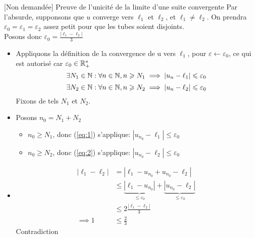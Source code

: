 \documentclass{article}
\renewenvironment{question_kholle}[2][ ]
{
	\subsection{\texorpdfstring{#2}{}}
	\notblank{#1}
	{
		\noindent #1
		\bigbreak
	}
	{}
	\begin{proof}
}
{
	\end{proof}
}
\begin{document}
\begin{question_kholle}[
		Soit u $\in \K ^ \N, (\ell_1, \ell_2) \in \K ^2$
		Si u converge vers $\ell_1$ et
		$\ell_2$, alors $\ell_1 = \ell_2$
	]{[Non demandée] Preuve de l'unicité de
		la limite d'une suite convergente}
	Par l'absurde, supponsons que $u$
	converge vers $\ell_1$ et $\ell_2$, et
	$\ell_1 \neq \ell_2$.
	On prendra $\varepsilon_0 =
		\varepsilon_1 = \varepsilon_2$ assez
	petit pour que les tubes soient disjoints.\\
	Posons donc $\varepsilon_0 =
		\frac{|\ell_1 - \ell_2|}{3}$
	\begin{itemize}
		\item Appliquons la définition de la
		      convergence de u vers $\ell_1$,
		      pour $\varepsilon \leftarrow
			      \varepsilon_0$, ce qui est autorisé
		      car $\varepsilon_0 \in \mathbb R_+^*$
		      \begin{equation}\label{eq:1}
			      \exists N_1 \in \mathbb N : \forall n
			      \in \mathbb N, n \geqslant N_1 \implies
			      |u_n - \ell_1| \leqslant \varepsilon_0
		      \end{equation}
		      \begin{equation}\label{eq:2}
			      \exists N_2 \in \mathbb N : \forall n
			      \in \mathbb N, n \geqslant N_2 \implies
			      |u_n - \ell_2| \leqslant \varepsilon_0
		      \end{equation}
		      Fixons de tels $N_1$ et $N_2$.
		\item Posons $n_0 = N_1 + N_2$
		      \begin{itemize}
			      \item $n_0 \geqslant N_1$, donc
			            (\ref{eq:1}) s'applique:
			            $|u_{n_0} - \ell_1| \leqslant
				            \varepsilon_0$
			      \item $n_0 \geqslant N_2$, donc
			            (\ref{eq:2}) s'applique:
			            $|u_{n_0} - \ell_2| \leqslant
				            \varepsilon_0$
		      \end{itemize}
		\item
		      \begin{align*}
			      |\ell_1 - \ell_2| & = |\ell_1 -
			      u_{n_0} + u_{n_0} - \ell_2|
			      \\
			                        & \leqslant \underbrace{|\ell_1 -
				      u_{n_0}|}_{\leqslant
				      \varepsilon_0} +
			      \underbrace{|u_{n_0} -
			      \ell_2|}_{\leqslant \varepsilon_0}                  \\
			                        & \leqslant 2 \frac{|\ell_1 -
				      \ell_2|}{3}
			      \\
			      \implies 1        & \leqslant \frac 2 3
		      \end{align*}
		      Contradiction
	\end{itemize}
\end{question_kholle}
\end{document}
